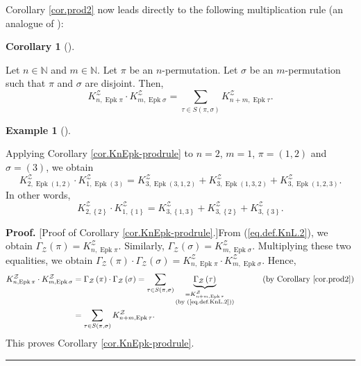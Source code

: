 \documentclass[numbers=enddot,12pt,final,onecolumn,notitlepage]{scrartcl}%
\theoremstyle{definition}
\newtheorem{coro}[theo]{Corollary}
\newenvironment{corollary}[1][]
{\begin{coro}[#1]\begin{leftbar}}
{\end{leftbar}\end{coro}}
\newtheorem{exmp}[theo]{Example}
\newenvironment{example}[1][]
{\begin{exmp}[#1]\begin{leftbar}}
{\end{leftbar}\end{exmp}}
\newenvironment{proof}[1][Proof]{\noindent\textbf{#1.} }{\ \rule{0.5em}{0.5em}}
\let\sumnonlimits\sum
\renewcommand{\sum}{\sumnonlimits\limits}
\begin{document}
Corollary \ref{cor.prod2} now leads directly to the following multiplication
rule (an analogue of \cite[(3.1)]{Stembr97}):

\begin{corollary}
\label{cor.KnEpk-prodrule}Let $n\in\mathbb{N}$ and $m\in\mathbb{N}$. Let $\pi$
be an $n$-permutation. Let $\sigma$ be an $m$-permutation such that $\pi$
and $\sigma$ are disjoint. Then,
\[
K_{n,\operatorname{Epk} \pi}^{\mathcal{Z}}
\cdot K_{m,\operatorname{Epk} \sigma}^{\mathcal{Z}}
= \sum_{\tau\in S\left(  \pi,\sigma\right)  }
   K_{n+m,\operatorname{Epk}\tau}^{\mathcal{Z}}.
\]

\end{corollary}

\begin{example}
Applying Corollary \ref{cor.KnEpk-prodrule} to $n=2$, $m=1$, $\pi=\left(
1,2\right)  $ and $\sigma=\left(  3\right)  $, we obtain%
\[
K_{2,\operatorname{Epk}\left(  1,2\right)  }^{\mathcal{Z}}\cdot
K_{1,\operatorname{Epk}\left(  3\right)  }^{\mathcal{Z}}%
=K_{3,\operatorname{Epk}\left(  3,1,2\right)  }^{\mathcal{Z}}%
+K_{3,\operatorname{Epk}\left(  1,3,2\right)  }^{\mathcal{Z}}%
+K_{3,\operatorname{Epk}\left(  1,2,3\right)  }^{\mathcal{Z}}.
\]
In other words,%
\[
K_{2,\left\{  2\right\}  }^{\mathcal{Z}}\cdot K_{1,\left\{  1\right\}
}^{\mathcal{Z}}=K_{3,\left\{  1,3\right\}  }^{\mathcal{Z}}+K_{3,\left\{
2\right\}  }^{\mathcal{Z}}+K_{3,\left\{  3\right\}  }^{\mathcal{Z}}.
\]

\end{example}

\begin{proof}
[Proof of Corollary \ref{cor.KnEpk-prodrule}.]From (\ref{eq.def.KnL.2}), we
obtain
$\Gamma_{\mathcal{Z}}\left(  \pi\right)
=K_{n,\operatorname{Epk}\pi}^{\mathcal{Z}}$.
Similarly, $\Gamma_{\mathcal{Z}}\left(  \sigma\right)
=K_{m,\operatorname{Epk}\sigma}^{\mathcal{Z}}$. Multiplying these two
equalities, we obtain $\Gamma_{\mathcal{Z}}\left(  \pi\right)  \cdot
\Gamma_{\mathcal{Z}}\left(  \sigma\right)  =K_{n,\operatorname{Epk}\pi
}^{\mathcal{Z}}\cdot K_{m,\operatorname{Epk}\sigma}^{\mathcal{Z}}$. Hence,%
\begin{align*}
K_{n,\operatorname{Epk}\pi}^{\mathcal{Z}}
\cdot K_{m,\operatorname{Epk} \sigma}^{\mathcal{Z}}
&  =\Gamma_{\mathcal{Z}}\left(  \pi\right)  \cdot
\Gamma_{\mathcal{Z}}\left(  \sigma\right)
=\sum_{\tau\in S\left(  \pi
,\sigma\right)  }\underbrace{\Gamma_{\mathcal{Z}}\left(  \tau\right)
}_{\substack{=K_{n+m,\operatorname{Epk}\tau}^{\mathcal{Z}}\\\text{(by
(\ref{eq.def.KnL.2}))}}}\ \ \ \ \ \ \ \ \ \ \left(  \text{by Corollary
\ref{cor.prod2}}\right) \\
&  =\sum_{\tau\in S\left(  \pi,\sigma\right)  }K_{n+m,\operatorname{Epk}\tau
}^{\mathcal{Z}}.
\end{align*}
This proves Corollary \ref{cor.KnEpk-prodrule}.
\end{proof}
\end{document}
